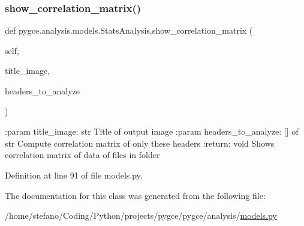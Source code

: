 \subsubsection{\texorpdfstring{show\+\_\+correlation\+\_\+matrix()}{show\_correlation\_matrix()}}
{\footnotesize\ttfamily def pygce.\+analysis.\+models.\+Stats\+Analysis.\+show\+\_\+correlation\+\_\+matrix (\begin{DoxyParamCaption}\item[{}]{self,  }\item[{}]{title\+\_\+image,  }\item[{}]{headers\+\_\+to\+\_\+analyze }\end{DoxyParamCaption})}

\begin{DoxyVerb}:param title_image: str
    Title of output image
:param headers_to_analyze: [] of str
    Compute correlation matrix of only these headers
:return: void
    Shows correlation matrix of data of files in folder
\end{DoxyVerb}
 

Definition at line 91 of file models.\+py.



The documentation for this class was generated from the following file\+:\begin{DoxyCompactItemize}
\item 
/home/stefano/\+Coding/\+Python/projects/pygce/pygce/analysis/\hyperlink{models_8py}{models.\+py}\end{DoxyCompactItemize}
